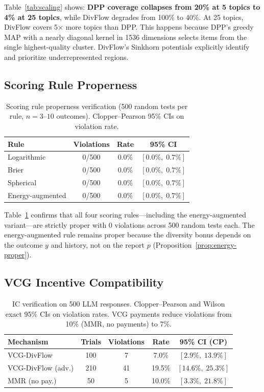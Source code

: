 \documentclass[10pt]{article}
\begin{document}
Table~\ref{tab:scaling} shows: \textbf{DPP coverage collapses from 20\% at 5 topics to 4\% at 25 topics}, while DivFlow degrades from 100\% to 40\%.
At 25 topics, DivFlow covers 5$\times$ more topics than DPP.
This happens because DPP's greedy MAP with a nearly diagonal kernel in 1536 dimensions selects items from the single highest-quality cluster.
DivFlow's Sinkhorn potentials explicitly identify and prioritize underrepresented regions.

\subsection{Scoring Rule Properness}
\label{sec:properness}

\begin{table}[t]
\centering
\caption{Scoring rule properness verification (500 random tests per rule, $n{=}3$--$10$ outcomes).
Clopper--Pearson 95\% CIs on violation rate.}
\label{tab:properness}
\begin{tabular}{lccc}
\toprule
\textbf{Rule} & \textbf{Violations} & \textbf{Rate} & \textbf{95\% CI} \\
\midrule
Logarithmic        & 0/500 & 0.0\% & $[0.0\%,\; 0.7\%]$ \\
Brier              & 0/500 & 0.0\% & $[0.0\%,\; 0.7\%]$ \\
Spherical          & 0/500 & 0.0\% & $[0.0\%,\; 0.7\%]$ \\
Energy-augmented   & 0/500 & 0.0\% & $[0.0\%,\; 0.7\%]$ \\
\bottomrule
\end{tabular}
\end{table}

Table~\ref{tab:properness} confirms that all four scoring rules---including the energy-augmented variant---are strictly proper with 0 violations across 500 random tests each.
The energy-augmented rule remains proper because the diversity bonus depends on the outcome $y$ and history, not on the report $p$ (Proposition~\ref{prop:energy-proper}).

\subsection{VCG Incentive Compatibility}
\label{sec:ic-results}

\begin{table}[t]
\centering
\caption{IC verification on 500 LLM responses.
Clopper--Pearson and Wilson exact 95\% CIs on violation rates.
VCG payments reduce violations from 10\% (MMR, no payments) to 7\%.}
\label{tab:ic}
\begin{tabular}{lcccc}
\toprule
\textbf{Mechanism} & \textbf{Trials} & \textbf{Violations} & \textbf{Rate} & \textbf{95\% CI (CP)} \\
\midrule
VCG-DivFlow        & 100  & 7  & 7.0\% & $[2.9\%,\; 13.9\%]$ \\
VCG-DivFlow (adv.) & 210  & 41 & 19.5\% & $[14.6\%,\; 25.3\%]$ \\
MMR (no pay.)       & 50 & 5 & 10.0\% & $[3.3\%,\; 21.8\%]$ \\
\bottomrule
\end{tabular}
\end{table}
\end{document}
